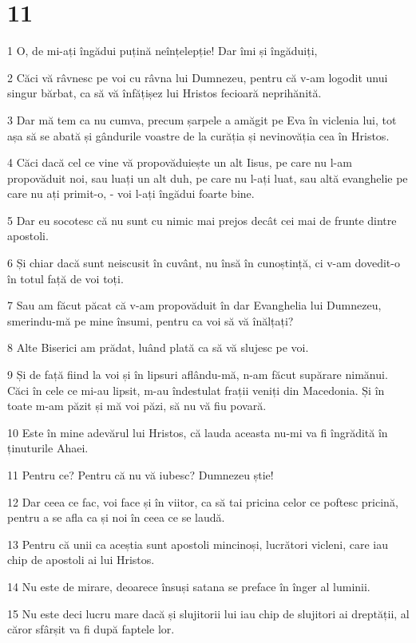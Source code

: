 \chapter{11}

\par 1 O, de mi-ați îngădui puțină neînțelepție! Dar îmi și îngăduiți,
\par 2 Căci vă râvnesc pe voi cu râvna lui Dumnezeu, pentru că v-am logodit unui singur bărbat, ca să vă înfățișez lui Hristos fecioară neprihănită.
\par 3 Dar mă tem ca nu cumva, precum șarpele a amăgit pe Eva în viclenia lui, tot așa să se abată și gândurile voastre de la curăția și nevinovăția cea în Hristos.
\par 4 Căci dacă cel ce vine vă propovăduiește un alt Iisus, pe care nu l-am propovăduit noi, sau luați un alt duh, pe care nu l-ați luat, sau altă evanghelie pe care nu ați primit-o, - voi l-ați îngădui foarte bine.
\par 5 Dar eu socotesc că nu sunt cu nimic mai prejos decât cei mai de frunte dintre apostoli.
\par 6 Și chiar dacă sunt neiscusit în cuvânt, nu însă în cunoștință, ci v-am dovedit-o în totul față de voi toți.
\par 7 Sau am făcut păcat că v-am propovăduit în dar Evanghelia lui Dumnezeu, smerindu-mă pe mine însumi, pentru ca voi să vă înălțați?
\par 8 Alte Biserici am prădat, luând plată ca să vă slujesc pe voi.
\par 9 Și de față fiind la voi și în lipsuri aflându-mă, n-am făcut supărare nimănui. Căci în cele ce mi-au lipsit, m-au îndestulat frații veniți din Macedonia. Și în toate m-am păzit și mă voi păzi, să nu vă fiu povară.
\par 10 Este în mine adevărul lui Hristos, că lauda aceasta nu-mi va fi îngrădită în ținuturile Ahaei.
\par 11 Pentru ce? Pentru că nu vă iubesc? Dumnezeu știe!
\par 12 Dar ceea ce fac, voi face și în viitor, ca să tai pricina celor ce poftesc pricină, pentru a se afla ca și noi în ceea ce se laudă.
\par 13 Pentru că unii ca aceștia sunt apostoli mincinoși, lucrători vicleni, care iau chip de apostoli ai lui Hristos.
\par 14 Nu este de mirare, deoarece însuși satana se preface în înger al luminii.
\par 15 Nu este deci lucru mare dacă și slujitorii lui iau chip de slujitori ai dreptății, al căror sfârșit va fi după faptele lor.
